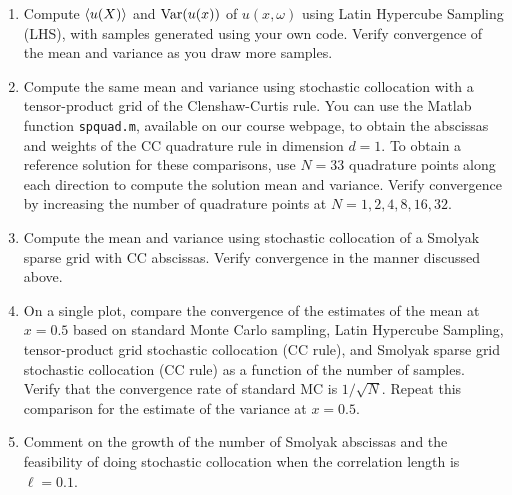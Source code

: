\documentclass[11pt]{article}
\begin{document}
\begin{enumerate}

\item Compute $\left\langle u(X) \right\rangle$ and $\operatorname{Var}(u(x))$ of $u(x,\omega)$ using Latin Hypercube Sampling (LHS), with samples generated using your own code. Verify convergence of the mean and variance as you draw more samples.

\item Compute the same mean and variance using stochastic collocation with a tensor-product grid of the Clenshaw-Curtis rule. You can use the Matlab function \lstinline|spquad.m|, available on our course webpage, to obtain the abscissas and weights of the CC quadrature rule in dimension $d=1$. To obtain a reference solution for these comparisons, use $N=33$ quadrature points along each direction to compute the solution mean and variance. Verify convergence by increasing the number of quadrature points at $N = 1, 2, 4, 8, 16, 32$.

\item Compute the mean and variance using stochastic collocation of a Smolyak sparse grid with CC abscissas. Verify convergence in the manner discussed above.

\item On a single plot, compare the convergence of the estimates of the mean at $x=0.5$ based on standard Monte Carlo sampling, Latin Hypercube Sampling, tensor-product grid stochastic collocation (CC rule), and Smolyak sparse grid stochastic collocation (CC rule) as a function of the number of samples. Verify that the convergence rate of standard MC is $1/\sqrt{N}$. Repeat this comparison for the estimate of the variance at $x=0.5$.

\item Comment on the growth of the number of Smolyak abscissas and the feasibility of doing stochastic collocation when the correlation length is $\ell = 0.1$.

\end{enumerate}



\end{document}
